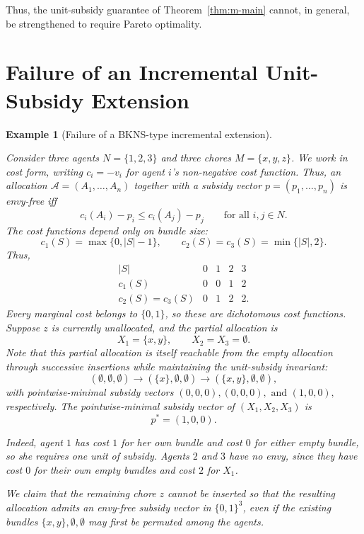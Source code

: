 \documentclass[sigconf,anonymous]{aamas}
\theoremstyle{acmplain}
\theoremstyle{acmdefinition}
\newtheorem{example}[theorem]{Example}
\theoremstyle{acmplain}
\begin{document}
Thus, the unit-subsidy guarantee of Theorem~\ref{thm:m-main} cannot, in general, be strengthened to require Pareto optimality.


\appendix

\section{Failure of an Incremental Unit-Subsidy Extension}
\label{sec:whynotbkns}


\begin{example}[Failure of a BKNS-type incremental extension]
\label{app:extension-failure}

Consider three agents $N=\{1,2,3\}$ and three chores $M=\{x,y,z\}$. We work in cost form, writing
\( c_i=-v_i \)
for agent \(i\)'s non-negative cost function. Thus, an allocation \(\mathcal A=(A_1,\ldots,A_n)\) together with a subsidy vector \(p=(p_1,\ldots,p_n)\) is envy-free iff
\[ c_i(A_i)-p_i\le c_i(A_j)-p_j
\qquad\text{for all } i,j\in N.
\]
The cost functions depend only on bundle size: \[ c_1(S)=\max\{0,|S|-1\}, \qquad c_2(S)=c_3(S)=\min\{|S|,2\}. \] Thus, \[
\begin{array}{c|cccc}
|S| & 0 & 1 & 2 & 3\\
\hline
c_1(S) & 0 & 0 & 1 & 2\\
c_2(S)=c_3(S) & 0 & 1 & 2 & 2 .
\end{array}
\] Every marginal cost belongs to $\{0,1\}$, so these are dichotomous cost functions. Suppose  $z$ is currently unallocated, and the partial allocation is \[
X_1=\{x,y\},
\qquad
X_2=X_3=\emptyset.
\] Note that this partial allocation is itself reachable from the empty allocation through successive insertions while maintaining the unit-subsidy invariant:
\[
(\emptyset,\emptyset,\emptyset)
\longrightarrow
(\{x\},\emptyset,\emptyset)
\longrightarrow
(\{x,y\},\emptyset,\emptyset),
\] with pointwise-minimal subsidy vectors
\(
(0,0,0), (0,0,0),\text{ and } (1,0,0),
\) respectively. The pointwise-minimal subsidy vector of $(X_1,X_2,X_3)$ is \[
p^*=(1,0,0).
\]

Indeed, agent $1$ has cost $1$ for her own bundle and cost $0$ for either empty bundle, so she requires one unit of subsidy. Agents $2$ and $3$ have no envy, since they have cost $0$ for their own empty bundles and cost $2$ for $X_1$.

We claim that the remaining chore $z$ cannot be inserted so that the resulting allocation admits an envy-free subsidy vector in $\{0,1\}^3$, even if the existing bundles $\{x,y\},\emptyset,\emptyset$ may first be permuted among the agents.


\end{example}
\end{document}

